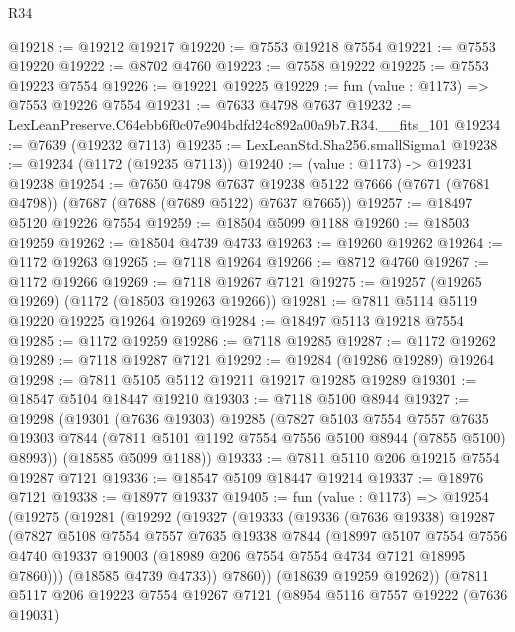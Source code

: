\begin{lexlean}{R34}
\begin{coremodule}
@19218 := @19212 @19217
@19220 := @7553 @19218 @7554
@19221 := @7553 @19220
@19222 := @8702 @4760
@19223 := @7558 @19222
@19225 := @7553 @19223 @7554
@19226 := @19221 @19225
@19229 := fun (value : @1173) => @7553 @19226 @7554
@19231 := @7633 @4798 @7637
@19232 := LexLeanPreserve.C64ebb6f0c07e904bdfd24c892a00a9b7.R34.__fits_101
@19234 := @7639 (@19232 @7113)
@19235 := LexLeanStd.Sha256.smallSigma1
@19238 := @19234 (@1172 (@19235 @7113))
@19240 := (value : @1173) -> @19231 @19238
@19254 := @7650
    @4798
    @7637
    @19238
    @5122
    @7666
    (@7671 (@7681 @4798))
    (@7687 (@7688 (@7689 @5122) @7637 @7665))
@19257 := @18497 @5120 @19226 @7554
@19259 := @18504 @5099 @1188
@19260 := @18503 @19259
@19262 := @18504 @4739 @4733
@19263 := @19260 @19262
@19264 := @1172 @19263
@19265 := @7118 @19264
@19266 := @8712 @4760
@19267 := @1172 @19266
@19269 := @7118 @19267 @7121
@19275 := @19257 (@19265 @19269) (@1172 (@18503 @19263 @19266))
@19281 := @7811 @5114 @5119 @19220 @19225 @19264 @19269
@19284 := @18497 @5113 @19218 @7554
@19285 := @1172 @19259
@19286 := @7118 @19285
@19287 := @1172 @19262
@19289 := @7118 @19287 @7121
@19292 := @19284 (@19286 @19289) @19264
@19298 := @7811 @5105 @5112 @19211 @19217 @19285 @19289
@19301 := @18547 @5104 @18447 @19210
@19303 := @7118 @5100 @8944
@19327 := @19298
    (@19301
      (@7636 @19303)
      @19285
      (@7827
        @5103
        @7554
        @7557
        @7635
        @19303
        @7844
        (@7811 @5101 @1192 @7554 @7556 @5100 @8944 (@7855 @5100) @8993))
      (@18585 @5099 @1188))
@19333 := @7811 @5110 @206 @19215 @7554 @19287 @7121
@19336 := @18547 @5109 @18447 @19214
@19337 := @18976 @7121
@19338 := @18977 @19337
@19405 := fun (value : @1173) =>
  @19254
    (@19275
      (@19281
        (@19292
          (@19327
            (@19333
              (@19336
                (@7636 @19338)
                @19287
                (@7827
                  @5108
                  @7554
                  @7557
                  @7635
                  @19338
                  @7844
                  (@18997
                    @5107
                    @7554
                    @7556
                    @4740
                    @19337
                    @19003
                    (@18989 @206 @7554 @7554 @4734 @7121 @18995 @7860)))
                (@18585 @4739 @4733))
              @7860))
          (@18639 @19259 @19262))
        (@7811
          @5117
          @206
          @19223
          @7554
          @19267
          @7121
          (@8954
            @5116
            @7557
            @19222
            (@7636 @19031)

\end{coremodule}
\end{lexlean}
